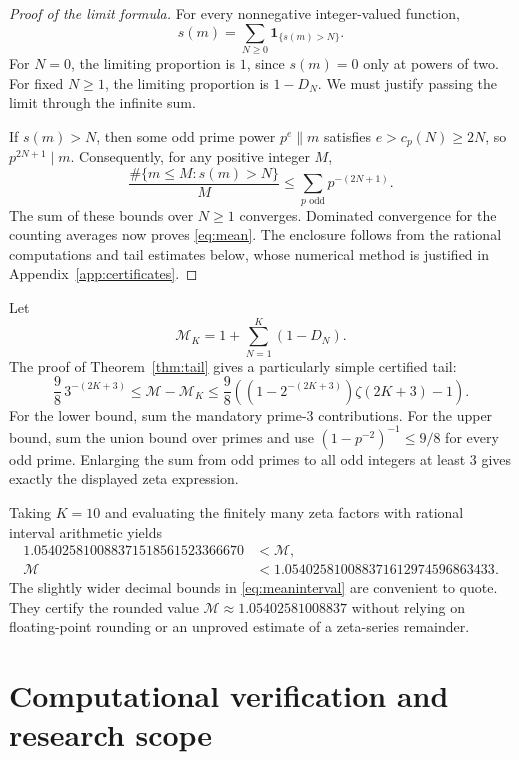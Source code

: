 \documentclass[11pt,a4paper]{article}
\numberwithin{equation}{section}
\theoremstyle{definition}
\begin{document}
\begin{proof}[Proof of the limit formula]
For every nonnegative integer-valued function,
\[
s(m)=\sum_{N\ge0}\mathbf1_{\{s(m)>N\}}.
\]
For $N=0$, the limiting proportion is $1$, since $s(m)=0$ only at powers
of two. For fixed $N\ge1$, the limiting proportion is $1-D_N$.
We must justify passing the limit through the infinite sum.

If $s(m)>N$, then some odd prime power $p^e\parallel m$ satisfies
$e>c_p(N)\ge2N$, so $p^{2N+1}\mid m$. Consequently, for any positive
integer $M$,
\[
\frac{\#\{m\le M:s(m)>N\}}{M}
\le\sum_{p\text{ odd}}p^{-(2N+1)}.
\]
The sum of these bounds over $N\ge1$ converges. Dominated convergence
for the counting averages now proves \eqref{eq:mean}.
The enclosure follows from the rational computations and tail estimates
below, whose numerical method is justified in Appendix~\ref{app:certificates}.
\end{proof}

Let
\[
\mathcal M_K=1+\sum_{N=1}^{K}(1-D_N).
\]
The proof of Theorem~\ref{thm:tail} gives a particularly simple certified tail:
\begin{equation}\label{eq:meantail}
\frac98\,3^{-(2K+3)}
\le\mathcal M-\mathcal M_K
\le\frac98\left((1-2^{-(2K+3)})\zeta(2K+3)-1\right).
\end{equation}
For the lower bound, sum the mandatory prime-$3$ contributions. For the
upper bound, sum the union bound over primes and use
$(1-p^{-2})^{-1}\le9/8$ for every odd prime. Enlarging the sum from odd
primes to all odd integers at least $3$ gives exactly the displayed
zeta expression.

Taking $K=10$ and evaluating the finitely many zeta factors with rational
interval arithmetic yields
\[
\begin{split}
1.054025810088371518561523366670
&<\mathcal M,\\
\mathcal M&<
1.054025810088371612974596863433.
\end{split}
\]
The slightly wider decimal bounds in \eqref{eq:meaninterval} are convenient
to quote. They certify the rounded value
$\mathcal M\approx1.05402581008837$ without relying on floating-point
rounding or an unproved estimate of a zeta-series remainder.

\section{Computational verification and research scope}
\label{sec:verification}
\end{document}
